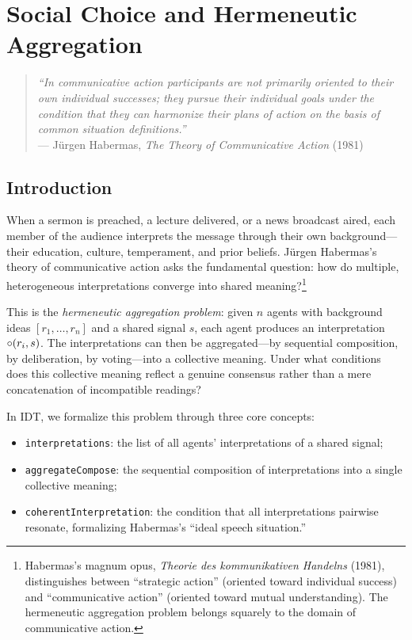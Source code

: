 \chapter{Social Choice and Hermeneutic Aggregation}
\label{ch:social}

\begin{quote}
\textit{``In communicative action participants are not primarily oriented to
their own individual successes; they pursue their individual goals under the
condition that they can harmonize their plans of action on the basis of
common situation definitions.''}\\
--- J\"urgen Habermas, \textit{The Theory of Communicative Action} (1981)
\end{quote}

\vspace{1em}

\section{Introduction}

When a sermon is preached, a lecture delivered, or a news broadcast aired,
each member of the audience interprets the message through their own
background---their education, culture, temperament, and prior beliefs.
J\"urgen Habermas's theory of communicative action asks the fundamental
question: how do multiple, heterogeneous interpretations converge into shared
meaning?\footnote{Habermas's magnum opus, \textit{Theorie des kommunikativen
Handelns} (1981), distinguishes between ``strategic action'' (oriented
toward individual success) and ``communicative action'' (oriented toward
mutual understanding).  The hermeneutic aggregation problem belongs squarely
to the domain of communicative action.}

This is the \emph{hermeneutic aggregation problem}: given $n$ agents with
background ideas $[r_1, \ldots, r_n]$ and a shared signal $s$, each agent
produces an interpretation $\circ(r_i, s)$.  The interpretations can then
be aggregated---by sequential composition, by deliberation, by voting---into
a collective meaning.  Under what conditions does this collective meaning
reflect a genuine consensus rather than a mere concatenation of
incompatible readings?

In IDT, we formalize this problem through three core concepts:
\begin{itemize}
  \item \texttt{interpretations}: the list of all agents' interpretations of a
    shared signal;
  \item \texttt{aggregateCompose}: the sequential composition of
    interpretations into a single collective meaning;
  \item \texttt{coherentInterpretation}: the condition that all
    interpretations pairwise resonate, formalizing Habermas's ``ideal speech
    situation.''
\end{itemize}

